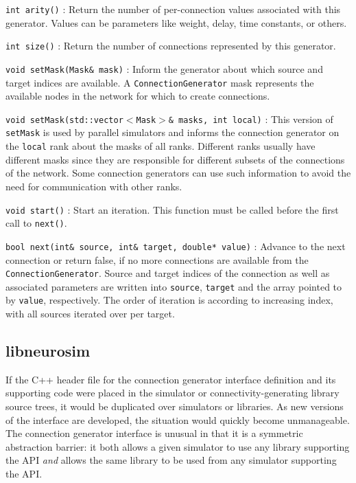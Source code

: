 \documentclass{frontiersSCNS} %
\begin{document}
\begin{unlist}
\item[\tt int arity()]: Return the number of per-connection values
  associated with this generator. Values can be parameters like
  weight, delay, time constants, or others.
\item[\tt int size()]: Return the number of connections represented by
  this generator.
\item[\tt void setMask(Mask\& mask)]: Inform the generator about which
  source and target indices are available. A
  \verb|ConnectionGenerator| mask represents the available nodes in
  the network for which to create connections.
\item[\tt void setMask(std::vector$<$Mask$>$\& masks, int local)]:
  This version of \texttt{setMask} is used by parallel simulators and
  informs the connection generator on the \verb|local| rank about the
  masks of all ranks. Different ranks usually have different masks
  since they are responsible for different subsets of the connections
  of the network. Some connection generators can use such information
  to avoid the need for communication with other ranks.
\item[\tt void start()]: Start an iteration. This function must be called
  before the first call to \verb|next()|.
\item[\tt bool next(int\& source, int\& target, double* value)]:
  Advance to the next connection or return false, if no more
  connections are available from the \verb|ConnectionGenerator|.
  Source and target indices of the connection as well as associated
  parameters are written into \verb|source|, \verb|target| and the
  array pointed to by \verb|value|, respectively. The order of
  iteration is according to increasing index, with all sources
  iterated over per target.
\end{unlist}

\subsection{libneurosim}\label{sec:libneurosim}
If the C++ header file for the connection generator interface
definition and its supporting code were placed in the simulator or
connectivity-generating library source trees, it would be duplicated
over simulators or libraries.  As new versions of the interface are
developed, the situation would quickly become unmanageable. The
connection generator interface is unusual in that it is a symmetric
abstraction barrier: it both allows a given simulator to use any
library supporting the API \emph{and} allows the same library to be
used from any simulator supporting the API.
\end{document}
